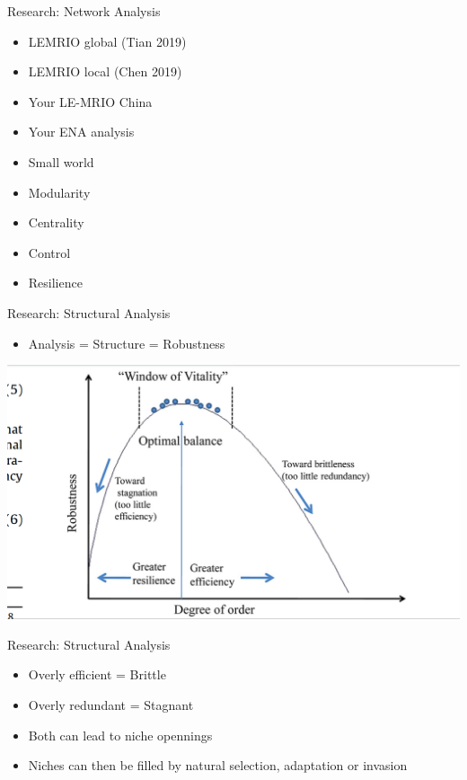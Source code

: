 \documentclass[ignorenonframetext,]{beamer}
\providecommand{\tightlist}{%
  \setlength{\itemsep}{0pt}\setlength{\parskip}{0pt}}
\begin{document}
\begin{frame}{Research: Network Analysis}

\begin{itemize}
\tightlist
\item
  LEMRIO global (Tian 2019)
\item
  LEMRIO local (Chen 2019)
\item
  Your LE-MRIO China
\item
  Your ENA analysis
\item
  Small world
\item
  Modularity
\item
  Centrality
\item
  Control
\item
  Resilience
\end{itemize}

\end{frame}

\begin{frame}{Research: Structural Analysis}

\begin{itemize}
\tightlist
\item
  Analysis = Structure = Robustness
\end{itemize}

\begin{center}\includegraphics[width=0.5\linewidth]{images/Fath_2015_Fig6} \end{center}

\end{frame}

\begin{frame}{Research: Structural Analysis}

\begin{itemize}
\tightlist
\item
  Overly efficient = Brittle
\item
  Overly redundant = Stagnant
\item
  Both can lead to niche opennings
\item
  Niches can then be filled by natural selection, adaptation or invasion
\end{itemize}

\end{frame}
\end{document}
